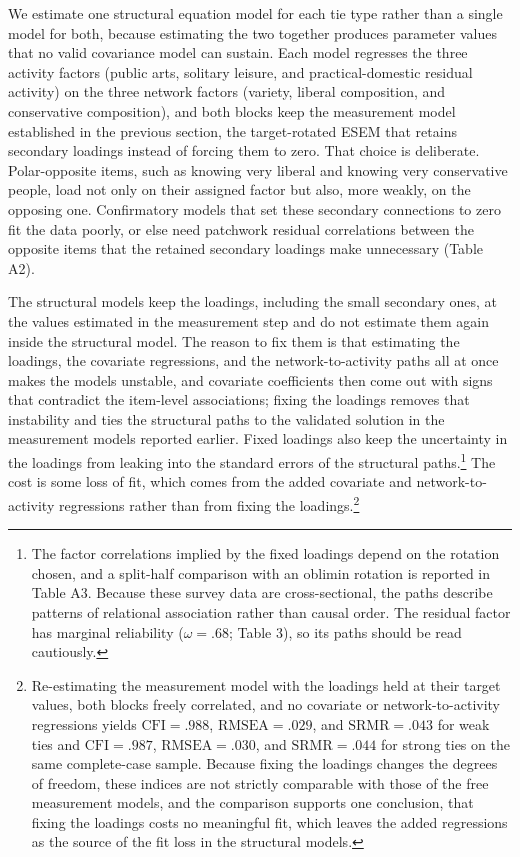 \documentclass[
  12pt
]{article}
\begin{document}
We estimate one structural equation model for each tie type rather than a single model for both, because estimating the two together produces parameter values that no valid covariance model can sustain. Each model regresses the three activity factors (public arts, solitary leisure, and practical-domestic residual activity) on the three network factors (variety, liberal composition, and conservative composition), and both blocks keep the measurement model established in the previous section, the target-rotated ESEM that retains secondary loadings instead of forcing them to zero. That choice is deliberate. Polar-opposite items, such as knowing very liberal and knowing very conservative people, load not only on their assigned factor but also, more weakly, on the opposing one. Confirmatory models that set these secondary connections to zero fit the data poorly, or else need patchwork residual correlations between the opposite items that the retained secondary loadings make unnecessary (Table A2).

The structural models keep the loadings, including the small secondary ones, at the values estimated in the measurement step and do not estimate them again inside the structural model. The reason to fix them is that estimating the loadings, the covariate regressions, and the network-to-activity paths all at once makes the models unstable, and covariate coefficients then come out with signs that contradict the item-level associations; fixing the loadings removes that instability and ties the structural paths to the validated solution in the measurement models reported earlier. Fixed loadings also keep the uncertainty in the loadings from leaking into the standard errors of the structural paths.\footnote{The factor correlations implied by the fixed loadings depend on the rotation chosen, and a split-half comparison with an oblimin rotation is reported in Table A3. Because these survey data are cross-sectional, the paths describe patterns of relational association rather than causal order. The residual factor has marginal reliability ($\omega = .68$; Table 3), so its paths should be read cautiously.} The cost is some loss of fit, which comes from the added covariate and network-to-activity regressions rather than from fixing the loadings.\footnote{Re-estimating the measurement model with the loadings held at their target values, both blocks freely correlated, and no covariate or network-to-activity regressions yields $\text{CFI} = .988$, $\text{RMSEA} = .029$, and $\text{SRMR} = .043$ for weak ties and $\text{CFI} = .987$, $\text{RMSEA} = .030$, and $\text{SRMR} = .044$ for strong ties on the same complete-case sample. Because fixing the loadings changes the degrees of freedom, these indices are not strictly comparable with those of the free measurement models, and the comparison supports one conclusion, that fixing the loadings costs no meaningful fit, which leaves the added regressions as the source of the fit loss in the structural models.}
\end{document}
